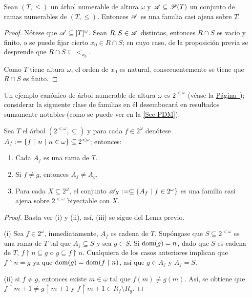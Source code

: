 \begin{proposicion}
	Sean $(T,\leq)$ un árbol numerable de altura $\omega$ y $\mathscr{A} \subseteq \mathscr{P}(T)$ un conjunto de ramas numerables de $(T,\leq)$. Entonces $\mathscr{A}$ es una familia casi ajena sobre $T$.
\end{proposicion}

\begin{proof}
	Nótese que $\mathscr{A} \subseteq [T]^\omega$. Sean $R,S \in \mathscr{A}$ distintos, entonces $R \cap S$ es vacío y finito, o se puede fijar cierto $x_0 \in R \cap S$; en cuyo caso, de la proposición previa se desprende que $R \cap S \subseteq <_{x_0}$.

	Como $T$ tiene altura $\omega$, el orden de $x_0$ es natural, consecuentemente se tiene que $R \cap S$ es finito.
\end{proof}

Un ejemplo canónico de árbol numerable de altura $\omega$ es $2^{<\omega}$ (véase la \hyperref[arbol-2Ramas]{Página~\pageref{arbol-2Ramas}}); considerar la siguiente clase de familias en él desembocará en resultados sumamente notables (como se puede ver en la \autoref{Sec-PDM}).

\begin{proposicion}
	Sea $T$ el árbol $(2^{<\omega},\subseteq)$ y para cada $f \in 2^\omega$ denótese $A_f:=\{ f \upharpoonright n \text{ $|$ } n \in \omega \} \subseteq 2^{<\omega}$; entonces:
	\begin{enumerate}
		\item Cada $A_f$ es una rama de $T$.
		\item Si $f\neq g$, entonces $A_f \neq A_g$.
		\item Para cada $X \subseteq 2^\omega$, el conjunto $\mathscr{A}_X := \subseteq \{A_f \text{ $|$ } f \in 2^\omega\}$ es una familia casi ajena sobre $2^{<\omega}$ biyectable con $X$.
	\end{enumerate}
\end{proposicion}
\begin{proof}
	Basta ver (i) y (ii), así, (iii) se sigue del Lema previo.

	(i) Sea $f \in 2^\omega$, inmediatamente, $A_f$ es cadena de $T$. Supóngase que $S \subseteq 2^{<\omega}$ es una rama de $T$ tal que $A_f \subseteq S$ y sea $g \in S$. Si $\operatorname{dom}(g)=n$, dado que $S$ es cadena de $T$, $f \upharpoonright n \subseteq g$ o $g \subseteq f \upharpoonright n$. Cualquiera de los casos anteriores implican que $f \upharpoonright n = g$ ya que $\operatorname{dom}(g)=\operatorname{dom}(f \upharpoonright n)$, así que $g \in A_f$ y $A_f = S$.

	(ii) si $f \neq g$, entonces existe $m\in \omega$ tal que $f(m) \neq g(m)$. Así, se obtiene que $f \upharpoonright m+1 \neq g \upharpoonright m+1$ y $f \upharpoonright m+1 \in R_f \setminus R_g$.
\end{proof}


